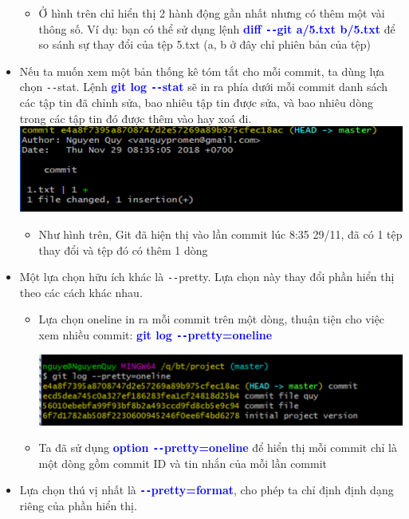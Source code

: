 \documentclass[12pt,a4paper]{report}
\begin{document}
\begin{itemize}
\begin{itemize}
\item Ở hình trên chỉ hiển thị 2 hành động gần nhất nhưng có thêm một vài thông số. Ví dụ: bạn có thể sử dụng lệnh \textcolor{blue}{\bf diff \texttt{-{}-}git a/5.txt b/5.txt} để so sánh sự thay đổi của tệp 5.txt (a, b ở đây chỉ phiên bản của tệp)\vskip 0.4cm
\end{itemize}
\item Nếu ta muốn xem một bản thống kê tóm tắt cho mỗi commit, ta dùng lựa chọn \texttt{-{}-}stat. Lệnh \textcolor{blue}{\bf git log \texttt{-{}-}stat} sẽ in ra phía dưới mỗi commit danh sách các tập tin đã chỉnh sửa, bao nhiêu tập tin được sửa, và bao nhiêu dòng trong các tập tin đó được thêm vào hay xoá đi.
	\includegraphics[width=0.8\linewidth]{screenshot019}

	\label{fig:screenshot019}
\begin{itemize}
\item Như hình trên, Git đã hiện thị vào lần commit lúc 8:35 29/11, đã có 1 tệp thay đổi và tệp đó có thêm 1 dòng
\end{itemize}
\item Một lựa chọn hữu ích khác là \texttt{-{}-}pretty. Lựa chọn này thay đổi phần hiển thị theo các cách khác nhau.
\begin{itemize}
\item Lựa chọn oneline in ra mỗi commit trên một dòng, thuận tiện cho việc xem nhiều commit: \textcolor{blue}{\bf git log \texttt{-{}-}pretty=oneline}

	\includegraphics[width=0.8\linewidth]{screenshot020}
	
	\label{fig:screenshot020}

\item Ta đã sử dụng \textcolor{blue}{\bf option \texttt{-{}-}pretty=oneline} để hiển thị mỗi commit chỉ là một dòng gồm commit ID và tin nhắn của mỗi lần commit
\end{itemize}
\item Lựa chọn thú vị nhất là \textcolor{blue}{\bf \texttt{-{}-}pretty=format}, cho phép ta chỉ định định dạng riêng của phần hiển thị.


\end{itemize}
\end{document}

